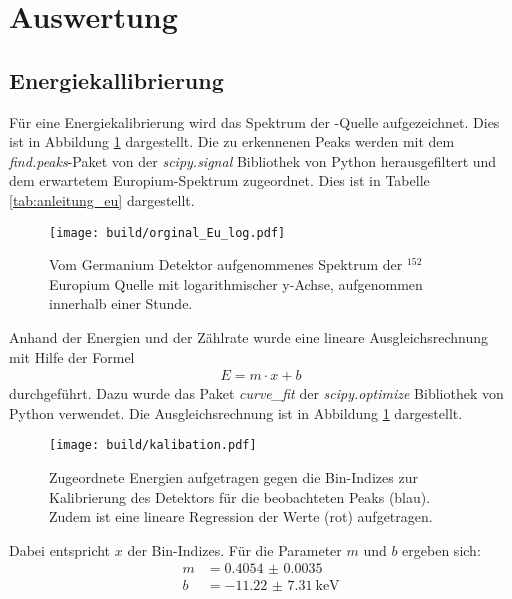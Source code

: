 \newpage
\section{Auswertung}
\label{sec:Auswertung}

\subsection{Energiekallibrierung}
\label{sec:Energiekallibrierung}

Für eine Energiekalibrierung wird das Spektrum der -Quelle
aufgezeichnet. Dies ist in Abbildung \ref{plt:Eu-Spektrum} dargestellt. Die zu
erkennenen Peaks werden mit dem \textit{find.peaks}-Paket von der \textit{scipy.signal} 
Bibliothek von Python herausgefiltert und dem erwartetem Europium-Spektrum
zugeordnet. Dies ist in Tabelle \ref{tab:anleitung_eu} dargestellt.
\begin{figure}[htb]
    \centering
    \texttt{[image: build/orginal\_Eu\_log.pdf]}
  \caption{Vom Germanium Detektor aufgenommenes Spektrum der $^{152}$Europium Quelle mit
  logarithmischer y-Achse, aufgenommen innerhalb einer Stunde.}
  \label{plt:Eu-Spektrum}
\end{figure}
Anhand der Energien und der Zählrate wurde eine lineare Ausgleichsrechnung
mit Hilfe der Formel
\begin{align*}
  E = m \cdot x + b
\end{align*}
durchgeführt. Dazu wurde das Paket \textit{curve\_fit} der \textit{scipy.optimize} Bibliothek von Python verwendet. Die
Ausgleichsrechnung ist in Abbildung \ref{plt:Eu-Spektrum} dargestellt.
\begin{figure}[htb]
  \centering
  \texttt{[image: build/kalibation.pdf]}
  \caption{Zugeordnete Energien aufgetragen gegen die Bin-Indizes zur
  Kalibrierung des Detektors für die beobachteten Peaks (blau). Zudem ist eine
  lineare Regression der Werte (rot) aufgetragen.}
  \label{plt:eichung}
\end{figure}
Dabei entspricht $x$ der Bin-Indizes. Für die Parameter $m$ und
$b$ ergeben sich:
\begin{align*}
	m &= \num{0.4054(35)} \\
  b &= \SI{-11.22(731)}{\kilo\electronvolt}
\end{align*}

\FloatBarrier
